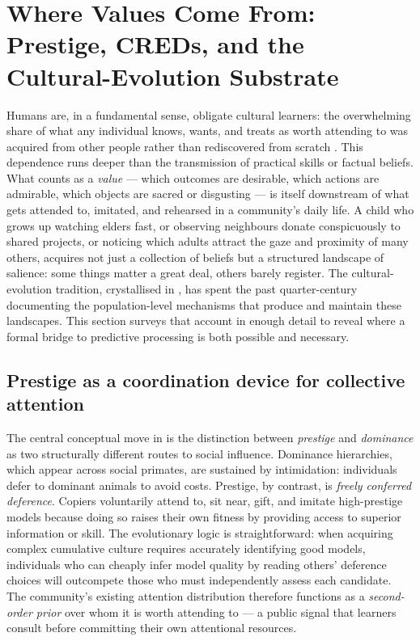 \section{Where Values Come From: Prestige, CREDs, and the Cultural-Evolution
Substrate}\label{sec:cultural-evolution}

Humans are, in a fundamental sense, obligate cultural learners: the overwhelming
share of what any individual knows, wants, and treats as worth attending to was
acquired from other people rather than rediscovered from scratch
\citep{henrichGilWhite2001Prestige}.
This dependence runs deeper than the transmission of practical skills or factual
beliefs.
What counts as a \emph{value} — which outcomes are desirable, which actions are
admirable, which objects are sacred or disgusting — is itself downstream of what
gets attended to, imitated, and rehearsed in a community's daily life.
A child who grows up watching elders fast, or observing neighbours donate
conspicuously to shared projects, or noticing which adults attract the gaze and
proximity of many others, acquires not just a collection of beliefs but a
structured landscape of salience: some things matter a great deal, others barely
register.
The cultural-evolution tradition, crystallised in \citet{henrichGilWhite2001Prestige},
has spent the past quarter-century documenting the population-level mechanisms
that produce and maintain these landscapes.
This section surveys that account in enough detail to reveal where a formal
bridge to predictive processing is both possible and necessary.

\subsection*{Prestige as a coordination device for collective attention}

The central conceptual move in \citet{henrichGilWhite2001Prestige} is the
distinction between \emph{prestige} and \emph{dominance} as two structurally
different routes to social influence.
Dominance hierarchies, which appear across social primates, are sustained by
intimidation: individuals defer to dominant animals to avoid costs.
Prestige, by contrast, is \emph{freely conferred deference}.
Copiers voluntarily attend to, sit near, gift, and imitate high-prestige models
because doing so raises their own fitness by providing access to superior
information or skill.
The evolutionary logic is straightforward: when acquiring complex cumulative
culture requires accurately identifying good models, individuals who can cheaply
infer model quality by reading others' deference choices will outcompete those
who must independently assess each candidate.
The community's existing attention distribution therefore functions as a
\emph{second-order prior} over whom it is worth attending to — a public signal
that learners consult before committing their own attentional resources.


